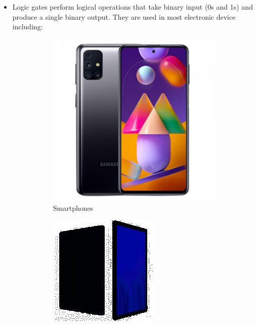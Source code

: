 \documentclass[10pt,a4paper,onecolumn]{article}
\begin{document}
\begin{itemize}
		\item Logic gates perform logical operations that take binary input (0s and 1s) and produce  a single binary output. They are used in most electronic device including: \\
			\begin{figure}[h!]
				\centering
				\begin{subfigure}[b]{0.2\linewidth}
				\includegraphics[width=\linewidth]{picture1.jpg}
				\caption{Smartphones}
				\end{subfigure}
			\begin{subfigure}[b]{0.2\linewidth}
				\includegraphics[width=\linewidth]{picture2.jpg}

\end{subfigure}
\end{figure}
\end{itemize}
\end{document}
